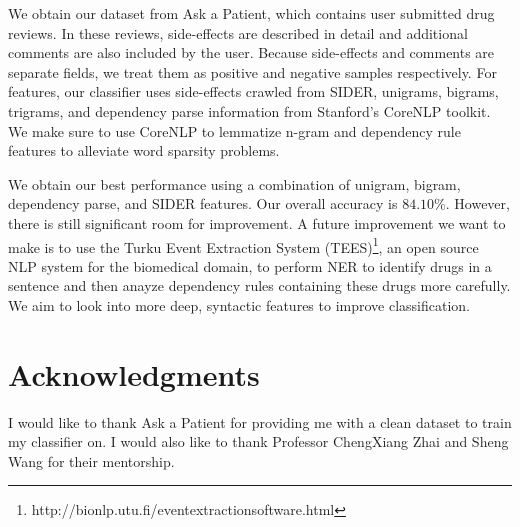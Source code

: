 \documentclass{acm_proc_article-sp}
\begin{document}
We obtain our dataset from Ask a Patient, which contains user submitted drug reviews. In these reviews, side-effects are described in detail and additional comments are also included by the user. Because side-effects and comments are separate fields, we treat them as positive and negative samples respectively. For features, our classifier uses side-effects crawled from SIDER, unigrams, bigrams, trigrams, and dependency parse information from Stanford's CoreNLP toolkit. We make sure to use CoreNLP to lemmatize n-gram and dependency rule features to alleviate word sparsity problems.

We obtain our best performance using a combination of unigram, bigram, dependency parse, and SIDER features. Our overall accuracy is $84.10\%$. However, there is still significant room for improvement. A future improvement we want to make is to use the Turku Event Extraction System (TEES)\footnote{http://bionlp.utu.fi/eventextractionsoftware.html}, an open source NLP system for the biomedical domain, to perform NER to identify drugs in a sentence and then anayze dependency rules containing these drugs more carefully. We aim to look into more deep, syntactic features to improve classification.

\section{Acknowledgments}
I would like to thank Ask a Patient for providing me with a clean dataset to train my classifier on. I would also like to thank Professor ChengXiang Zhai and Sheng Wang for their mentorship. 
%

%
%

\end{document}
